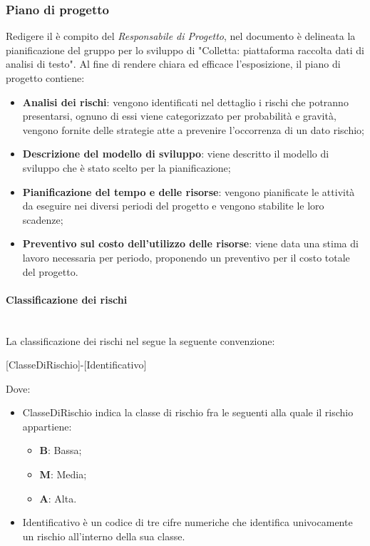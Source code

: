 \subsubsection{Piano di progetto}
Redigere il \PdP \space è compito del \textit{Responsabile di Progetto}, nel documento è delineata la pianificazione del gruppo \gruppo \space per lo sviluppo
di "Colletta: piattaforma raccolta dati di analisi di testo". \newline
Al fine di rendere chiara ed efficace l'esposizione, il piano di progetto contiene:
\begin{itemize}
	\item \textbf{Analisi dei rischi}: vengono identificati nel dettaglio i rischi che potranno presentarsi, ognuno di essi viene categorizzato per probabilità e gravità, vengono fornite delle strategie atte a prevenire l’occorrenza di un dato rischio;
\item \textbf{Descrizione del modello di sviluppo}: viene descritto il modello di sviluppo che è stato scelto per la pianificazione;

\item \textbf{Pianificazione del tempo e delle risorse}: vengono pianificate le attività da eseguire nei diversi periodi del progetto e vengono stabilite le loro scadenze;

\item \textbf{Preventivo sul costo dell'utilizzo delle risorse}: viene data una stima di lavoro necessaria per periodo,
proponendo un preventivo per il costo totale del progetto.

\end{itemize}

\paragraph{Classificazione dei rischi}\mbox{}\\
La classificazione dei rischi nel \PdP \space segue la seguente convenzione:
\begin{center}
	[ClasseDiRischio]-[Identificativo]
\end{center}
Dove:
\begin{itemize}
\item ClasseDiRischio indica la classe di rischio fra le seguenti alla quale il rischio appartiene:
	\begin{itemize}
	\item \textbf{B}: Bassa;
	\item \textbf{M}: Media;
	\item \textbf{A}: Alta.
	\end{itemize}
\item Identificativo è un codice di tre cifre numeriche che identifica univocamente un rischio all'interno della sua classe.
\end{itemize}

